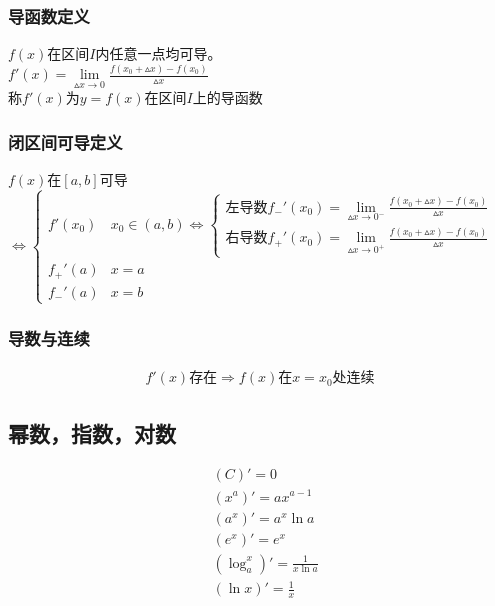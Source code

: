 \subsubsection{导函数定义}
$f(x)$在区间$I$内任意一点均可导。\\
$f'(x)=\lim\limits_{\vartriangle x\to 0}\frac{f(x_0+\vartriangle x)-f(x_0)}{\vartriangle x}$\\
称$f'(x)$为$y=f(x)$在区间$I$上的导函数
\subsubsection{闭区间可导定义}
$f(x)$在$[a,b]$可导$\Leftrightarrow\begin{cases}
  f'(x_0)  &x_0\in(a,b)\Leftrightarrow\begin{cases}
    \mbox{左导数}f_-'(x_0)=\lim\limits_{\vartriangle x\to 0^-}\frac{f(x_0+\vartriangle x)-f(x_0)}{\vartriangle x}\\
    \mbox{右导数}f_+'(x_0)=\lim\limits_{\vartriangle x\to 0^+}\frac{f(x_0+\vartriangle x)-f(x_0)}{\vartriangle x}
  \end{cases}\\
  f_+'(a) &x=a\\
  f_-'(a) &x=b
\end{cases}$
\subsubsection{导数与连续}
\begin{align}\label{derivative_continuity}
  f'(x)\mbox{存在}\Rightarrow f(x)\mbox{在}x=x_0\mbox{处连续}
\end{align}
\subsection{幂数，指数，对数}
\begin{align}
&(C)' = 0\label{derivative_1} \\
&(x^a)' = ax^{a-1} \label{derivative_2} \\
&(a^x)' = a^x\ln a \label{derivative_3}\\
&(e^x)' = e^x \label{derivative_4}\\
&(\log_a^x)' = \frac{1}{x\ln a} \label{derivative_5}\\
&(\ln{x})' = \frac{1}{x} \label{derivative_6}
\end{align}

